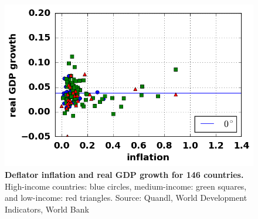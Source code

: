 \begin{figure}[h]
\caption{\label{fig:inflation_gdp_open} \textbf{Deflator inflation and real GDP growth for 146 countries.} High-income countries: blue circles, medium-income: green squares, and low-income: red triangles. {\tiny Source: Quandl, World Development Indicators, World Bank}}
\hspace*{-.5cm}\includegraphics[height = 7.cm]{./png/fig_inflation_gdp_open.png}
\end{figure}